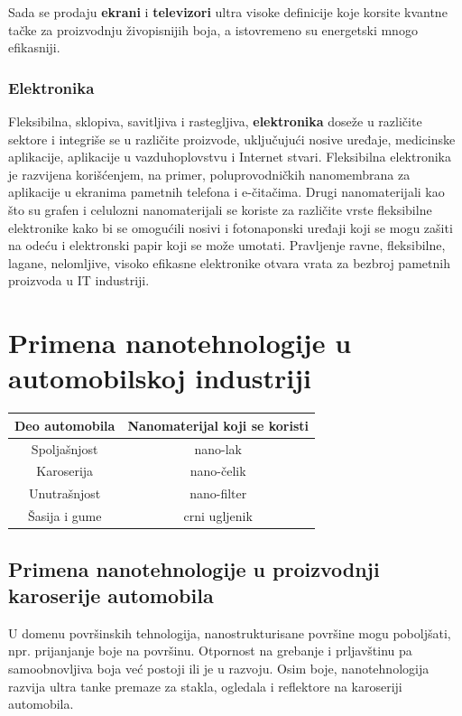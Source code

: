 \documentclass[a4paper]{article}
\begin{document}
{Sada se prodaju \textbf{ekrani} i \textbf{televizori} ultra visoke definicije koje korsite kvantne tačke za proizvodnju živopisnijih boja, a istovremeno su energetski mnogo efikasniji.\\

\subsubsection{Elektronika}
Fleksibilna, sklopiva, savitljiva i rastegljiva, \textbf{elektronika} doseže u različite sektore i integriše se u različite proizvode, uključujući nosive uređaje, medicinske aplikacije, aplikacije u vazduhoplovstvu i Internet stvari. Fleksibilna elektronika je razvijena korišćenjem, na primer, poluprovodničkih nanomembrana za aplikacije u ekranima pametnih telefona i e-čitačima. Drugi nanomaterijali kao što su grafen i celulozni nanomaterijali se koriste za različite vrste fleksibilne elektronike kako bi se omogućili nosivi i  fotonaponski uređaji koji se mogu zašiti na odeću i elektronski papir koji se može umotati. Pravljenje ravne, fleksibilne, lagane, nelomljive, visoko efikasne elektronike otvara vrata za bezbroj pametnih proizvoda u IT industriji.

\section{Primena nanotehnologije u automobilskoj industriji}

\begin{table}[h!]
\begin{center}
\begin{tabular}{|c|c|}
\hline
Deo automobila & Nanomaterijal koji se koristi \\
\hline
Spoljašnjost & nano-lak \\
\hline
Karoserija & nano-čelik \\
\hline
Unutrašnjost & nano-filter \\
\hline
Šasija i gume & crni ugljenik \\
\hline
\end{tabular}
\end{center}
\end{table}

\subsection{Primena nanotehnologije u proizvodnji karoserije automobila}

U domenu površinskih tehnologija, nanostrukturisane površine mogu poboljšati, npr. prijanjanje boje na površinu. Otpornost na grebanje i prljavštinu pa samoobnovljiva boja već postoji ili je u razvoju. Osim boje, nanotehnologija razvija ultra tanke premaze za stakla, ogledala i reflektore na karoseriji automobila.\\

}
\end{document}
